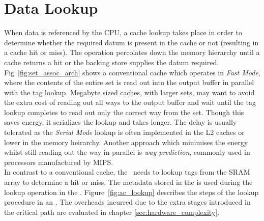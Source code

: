 \section{Data Lookup}

When data is referenced by the CPU, a cache lookup takes place in order to determine whether the required datum is present in the cache or not (resulting in a cache hit or miss). The operation percolates down the memory hierarchy until a cache returns a hit or the backing store supplies the datum required. Fig~\ref{fig:set_assoc_arch} shows a conventional cache which operates in \textit{Fast Mode}, where the contents of the entire set is read out into the output buffer in parallel with the tag lookup. Megabyte sized caches, with larger sets, may want to avoid the extra cost of reading out all ways to the output buffer and wait until the tag lookup completes to read out only the correct way from the set. Though this saves energy, it serializes the lookup and takes longer. The delay is usually tolerated as the \textit{Serial Mode} lookup is often implemented in the L2 caches or lower in the memory heirarchy. Another approach which minimises the energy whilst still reading out the way in parallel is \textit{way prediction}\cite{patent:DataCacheWayPrediction}, commonly used in processors manufactured by MIPS.
\\

In contrast to a conventional cache, the \AC\ needs to lookup tags from the SRAM array to determine a hit or miss. The metadata stored in the  is used during the lookup operation in the \AC{}. Figure~\ref{fig:ac_lookup} describes the steps of the lookup procedure in an \AC{}. The overheads incurred due to the extra stages introduced in the critical path are evaluated in chapter \ref{sec:hardware_complexity}.


